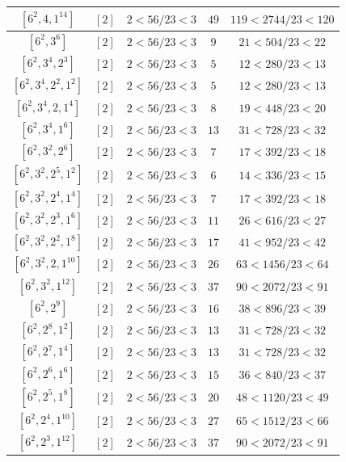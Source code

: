 \documentclass{article}%
\begin{document}
\begin{center}
\begin{longtable}{||c|c|c|c|c||}
$[6^{2}, 4, 1^{14}]$ & $[2]$ & $2 < 56/23 < 3$ & $49$ & $119 < 2744/23 < 120$ \\ \hline 
$[6^{2}, 3^{6}]$ & $[2]$ & $2 < 56/23 < 3$ & $9$ & $21 < 504/23 < 22$ \\ \hline 
$[6^{2}, 3^{4}, 2^{3}]$ & $[2]$ & $2 < 56/23 < 3$ & $5$ & $12 < 280/23 < 13$ \\ \hline 
$[6^{2}, 3^{4}, 2^{2}, 1^{2}]$ & $[2]$ & $2 < 56/23 < 3$ & $5$ & $12 < 280/23 < 13$ \\ \hline 
$[6^{2}, 3^{4}, 2, 1^{4}]$ & $[2]$ & $2 < 56/23 < 3$ & $8$ & $19 < 448/23 < 20$ \\ \hline 
$[6^{2}, 3^{4}, 1^{6}]$ & $[2]$ & $2 < 56/23 < 3$ & $13$ & $31 < 728/23 < 32$ \\ \hline 
$[6^{2}, 3^{2}, 2^{6}]$ & $[2]$ & $2 < 56/23 < 3$ & $7$ & $17 < 392/23 < 18$ \\ \hline 
$[6^{2}, 3^{2}, 2^{5}, 1^{2}]$ & $[2]$ & $2 < 56/23 < 3$ & $6$ & $14 < 336/23 < 15$ \\ \hline 
$[6^{2}, 3^{2}, 2^{4}, 1^{4}]$ & $[2]$ & $2 < 56/23 < 3$ & $7$ & $17 < 392/23 < 18$ \\ \hline 
$[6^{2}, 3^{2}, 2^{3}, 1^{6}]$ & $[2]$ & $2 < 56/23 < 3$ & $11$ & $26 < 616/23 < 27$ \\ \hline 
$[6^{2}, 3^{2}, 2^{2}, 1^{8}]$ & $[2]$ & $2 < 56/23 < 3$ & $17$ & $41 < 952/23 < 42$ \\ \hline 
$[6^{2}, 3^{2}, 2, 1^{10}]$ & $[2]$ & $2 < 56/23 < 3$ & $26$ & $63 < 1456/23 < 64$ \\ \hline 
$[6^{2}, 3^{2}, 1^{12}]$ & $[2]$ & $2 < 56/23 < 3$ & $37$ & $90 < 2072/23 < 91$ \\ \hline 
$[6^{2}, 2^{9}]$ & $[2]$ & $2 < 56/23 < 3$ & $16$ & $38 < 896/23 < 39$ \\ \hline 
$[6^{2}, 2^{8}, 1^{2}]$ & $[2]$ & $2 < 56/23 < 3$ & $13$ & $31 < 728/23 < 32$ \\ \hline 
$[6^{2}, 2^{7}, 1^{4}]$ & $[2]$ & $2 < 56/23 < 3$ & $13$ & $31 < 728/23 < 32$ \\ \hline 
$[6^{2}, 2^{6}, 1^{6}]$ & $[2]$ & $2 < 56/23 < 3$ & $15$ & $36 < 840/23 < 37$ \\ \hline 
$[6^{2}, 2^{5}, 1^{8}]$ & $[2]$ & $2 < 56/23 < 3$ & $20$ & $48 < 1120/23 < 49$ \\ \hline 
$[6^{2}, 2^{4}, 1^{10}]$ & $[2]$ & $2 < 56/23 < 3$ & $27$ & $65 < 1512/23 < 66$ \\ \hline 
$[6^{2}, 2^{3}, 1^{12}]$ & $[2]$ & $2 < 56/23 < 3$ & $37$ & $90 < 2072/23 < 91$ \\ \hline 

\end{longtable}
\end{center}
\end{document}
